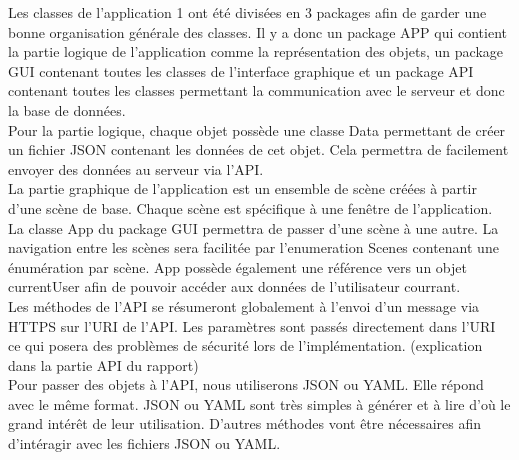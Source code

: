 \documentclass[../rapport.tex]{subfiles}
\begin{document}
Les classes de l'application 1 ont été divisées en 3 packages afin de garder une bonne organisation générale des classes.
Il y a donc un package APP qui contient la partie logique de l'application comme la représentation des objets, un package GUI contenant toutes les classes de l'interface graphique et un package API contenant toutes les classes permettant la communication avec le serveur et donc la base de données.\\

Pour la partie logique, chaque objet possède une classe Data permettant de créer un fichier JSON contenant les données de cet objet. Cela permettra de facilement envoyer des données au serveur via l'API.\\

La partie graphique de l'application est un ensemble de scène créées à partir d'une scène de base. Chaque scène est spécifique à une fenêtre de l'application.\\
La classe App du package GUI permettra de passer d'une scène à une autre. La navigation entre les scènes sera facilitée par l'enumeration Scenes contenant une énumération par scène. App possède également une référence vers un objet currentUser afin de pouvoir accéder aux données de l'utilisateur courrant.\\

Les méthodes de l'API se résumeront globalement à l'envoi d'un message via HTTPS sur l'URI de l'API. Les paramètres sont passés directement dans l'URI ce qui posera des problèmes de sécurité lors de l'implémentation. (explication dans la partie API du rapport) \\
Pour passer des objets à l'API, nous utiliserons JSON ou YAML. Elle répond avec le même format. JSON ou YAML sont très simples à générer et à lire d'où le grand intérêt de leur utilisation. D'autres méthodes vont être nécessaires afin d'intéragir avec les fichiers JSON ou YAML.
\end{document}
